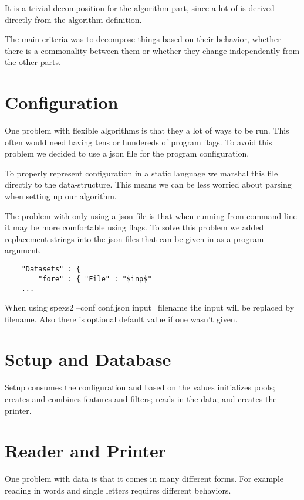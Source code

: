 It is a trivial decomposition for the algorithm part, since a lot of is derived 
directly from the algorithm definition.

The main criteria was to decompose things based on their behavior, whether there
is a commonality between them or whether they change independently from the other
parts.

\section{Configuration}

One problem with flexible algorithms is that they a lot of ways to be run.
This often would need having tens or hundereds of program flags.
To avoid this problem we decided to use a json file for the program
configuration.


To properly represent configuration in a static language we
marshal this file directly to the data-structure. This means we can be
less worried about parsing when setting up our algorithm.

The problem with only using a json file is that when running from
command line it may be more comfortable using flags. To solve this problem
we added replacement strings into the json files that can be given in as
a program argument.

\begin{verbatim}
	"Datasets" : {
		"fore" : { "File" : "$inp$"
	...
\end{verbatim}

When using spexs2 --conf conf.json input=filename the input will be
replaced by filename. Also there is optional default value if one wasn't given.

\section{Setup and Database}

Setup consumes the configuration and based on the values initializes pools; 
creates and combines features and filters; reads in the data; and creates
the printer.


\section{Reader and Printer}

One problem with data is that it comes in many different forms. For example reading in 
words and single letters requires different behaviors.

